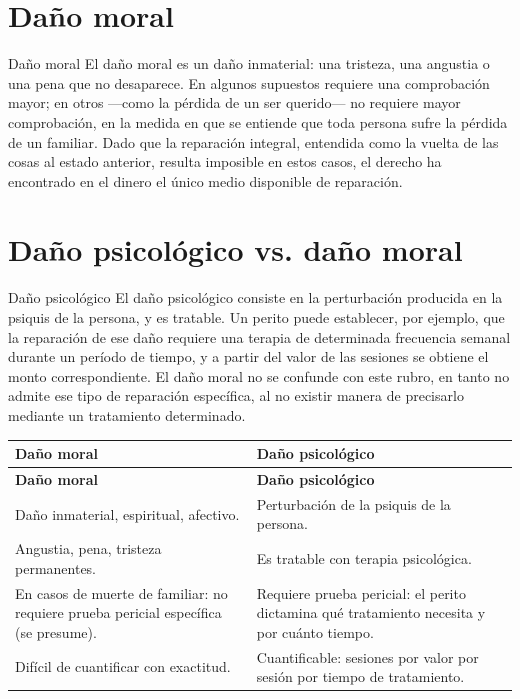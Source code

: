 \documentclass[12pt,oneside]{book}
\begin{document}
\section{Daño moral}

\begin{definition}{Daño moral}
El daño moral es un daño inmaterial: una tristeza, una angustia o una pena que no desaparece. En algunos supuestos requiere una comprobación mayor; en otros —como la pérdida de un ser querido— no requiere mayor comprobación, en la medida en que se entiende que toda persona sufre la pérdida de un familiar. Dado que la reparación integral, entendida como la vuelta de las cosas al estado anterior, resulta imposible en estos casos, el derecho ha encontrado en el dinero el único medio disponible de reparación.
\end{definition}

\section{Daño psicológico vs. daño moral}

\begin{definition}{Daño psicológico}
El daño psicológico consiste en la perturbación producida en la psiquis de la persona, y es tratable. Un perito puede establecer, por ejemplo, que la reparación de ese daño requiere una terapia de determinada frecuencia semanal durante un período de tiempo, y a partir del valor de las sesiones se obtiene el monto correspondiente. El daño moral no se confunde con este rubro, en tanto no admite ese tipo de reparación específica, al no existir manera de precisarlo mediante un tratamiento determinado.
\end{definition}

\begin{longtable}{>{\raggedright\arraybackslash}p{} >{\raggedright\arraybackslash}p{}}
\toprule
\textbf{Daño moral} & \textbf{Daño psicológico} \\
\midrule
\endfirsthead
\toprule
\textbf{Daño moral} & \textbf{Daño psicológico} \\
\midrule
\endhead
Daño inmaterial, espiritual, afectivo. & Perturbación de la psiquis de la persona. \\
Angustia, pena, tristeza permanentes. & Es tratable con terapia psicológica. \\
En casos de muerte de familiar: no requiere prueba pericial específica (se presume). & Requiere prueba pericial: el perito dictamina qué tratamiento necesita y por cuánto tiempo. \\
Difícil de cuantificar con exactitud. & Cuantificable: sesiones por valor por sesión por tiempo de tratamiento. \\
\bottomrule
\end{longtable}
\end{document}
